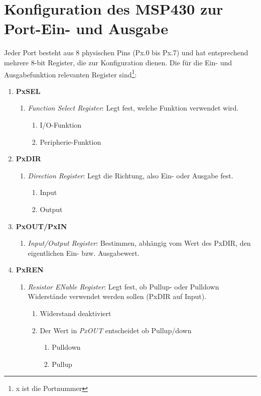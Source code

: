 \documentclass[a4paper, 12pt]{article}
\begin{document}
  
  \clearpage
  \setcounter{page}{1}

\section{Konfiguration des MSP430 zur Port-Ein- und Ausgabe}
Jeder Port besteht aus 8 physischen Pins (Px.0 bis Px.7) und hat entsprechend mehrere 8-bit Register, die zur
Konfiguration dienen. Die für die Ein- und Ausgabefunktion relevanten Register
sind\footnote{x ist die Portnummer}:
\begin{enumerate}
\item[] \textbf{PxSEL}
  \begin{enumerate}
    \item[] \textit{Function Select Register}: Legt fest, welche Funktion verwendet wird.
      \begin{enumerate}
        \item[0:]  I/O-Funktion
        \item[1:]  Peripherie-Funktion
      \end{enumerate}
  \end{enumerate}
\item[] \textbf{PxDIR}
  \begin{enumerate}
  \item[] \textit{Direction Register}: Legt die Richtung, also Ein- oder Ausgabe fest.
  \begin{enumerate}
    \item[0:]  Input
    \item[1:]  Output
  \end{enumerate}
  \end{enumerate}
\item[] \textbf{PxOUT/PxIN}
  \begin{enumerate}
\item[]    \textit{Input/Output Register}: Bestimmen, abhängig vom Wert des PxDIR, den
   eigentlichen Ein- bzw. Ausgabewert.
 \end{enumerate}
\item[] \textbf{PxREN}
  \begin{enumerate}
    \item[] \emph{Resistor ENable Register}: Legt fest, ob Pullup- oder Pulldown
      Widerstände verwendet werden sollen (PxDIR auf Input).
      \begin{enumerate}
        \item[0:] Widerstand deaktiviert
        \item[1:] Der Wert in \emph{PxOUT} entscheidet ob Pullup/down
          \begin{enumerate}
            \item[0:] Pulldown
            \item[1:] Pullup
          \end{enumerate}
      \end{enumerate}
  \end{enumerate}
\end{enumerate}
\end{document}
